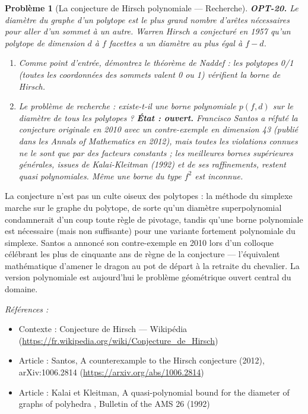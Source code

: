 \documentclass[11pt]{article}
\newtheorem{problem}{Problème}
\newenvironment{refs}{\par\small\noindent\emph{Références :}\begin{itemize}\setlength\itemsep{0pt}}{\end{itemize}\normalsize}
\begin{document}
\begin{problem}[{La conjecture de Hirsch polynomiale --- Recherche}]
\textbf{OPT-20.} Le diamètre du graphe d'un polytope est le plus grand nombre d'arêtes nécessaires pour aller d'un sommet à un autre. Warren Hirsch a conjecturé en 1957 qu'un polytope de dimension $d$ à $f$ facettes a un diamètre au plus égal à $f - d$.
\begin{enumerate}
\item[(a)] Comme point d'entrée, démontrez le théorème de Naddef : les polytopes 0/1 (toutes les coordonnées des sommets valent 0 ou 1) vérifient la borne de Hirsch.
\item[(b)] Le problème de recherche : existe-t-il une borne polynomiale $p(f, d)$ sur le diamètre de tous les polytopes ? \textbf{État : ouvert.} Francisco Santos a réfuté la conjecture originale en 2010 avec un contre-exemple en dimension 43 (publié dans les Annals of Mathematics en 2012), mais toutes les violations connues ne le sont que par des facteurs constants ; les meilleures bornes supérieures générales, issues de Kalai-Kleitman (1992) et de ses raffinements, restent quasi polynomiales. Même une borne du type $f^2$ est inconnue.
\end{enumerate}

\end{problem}

\noindent La conjecture n'est pas un culte oiseux des polytopes : la méthode du simplexe marche sur le graphe du polytope, de sorte qu'un diamètre superpolynomial condamnerait d'un coup toute règle de pivotage, tandis qu'une borne polynomiale est nécessaire (mais non suffisante) pour une variante fortement polynomiale du simplexe. Santos a annoncé son contre-exemple en 2010 lors d'un colloque célébrant les plus de cinquante ans de règne de la conjecture --- l'équivalent mathématique d'amener le dragon au pot de départ à la retraite du chevalier. La version polynomiale est aujourd'hui le problème géométrique ouvert central du domaine.

\begin{refs}
\item Contexte : Conjecture de Hirsch --- Wikipédia (\url{https://fr.wikipedia.org/wiki/Conjecture_de_Hirsch})
\item Article : Santos, \og{} A counterexample to the Hirsch conjecture \fg{} (2012), arXiv:1006.2814 (\url{https://arxiv.org/abs/1006.2814})
\item Article : Kalai et Kleitman, \og{} A quasi-polynomial bound for the diameter of graphs of polyhedra \fg{}, Bulletin of the AMS 26 (1992)
\end{refs}
\end{document}
